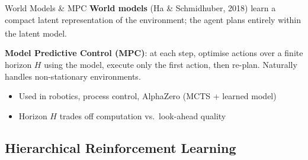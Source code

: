 \begin{v3topic}{World Models \& MPC}
    \textbf{World models} (Ha \& Schmidhuber, 2018) learn a compact
    latent representation of the environment; the agent plans entirely within
    the latent model.\textsuperscript{\cite[][Ch.~8]{suttonReinforcementLearningIntroduction2018}}

    \textbf{Model Predictive Control (MPC)}: at each step, optimise actions
    over a finite horizon $H$ using the model, execute only the first action,
    then re-plan. Naturally handles non-stationary environments.

    \begin{itemize}
        \item Used in robotics, process control, AlphaZero (MCTS + learned model)
        \item Horizon $H$ trades off computation vs.\ look-ahead quality
    \end{itemize}

\end{v3topic}

    \subsection{Hierarchical Reinforcement Learning}

